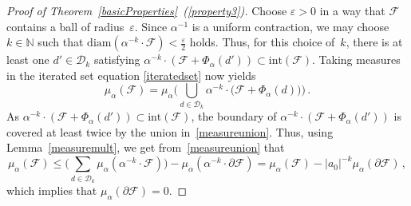 \documentclass[12pt]{amsart}
\theoremstyle{definition}
\theoremstyle{remark}
\numberwithin{equation}{section}
\begin{document}
\begin{proof}[Proof of Theorem~\ref{basicProperties}~(\ref{property3})]
Choose $\varepsilon>0$ in a way that $\mathcal{F}$ contains a ball of radius~$\varepsilon$.
Since $\alpha^{-1}$ is a uniform contraction, we may choose $k \in \mathbb{N}$ such that $\mathrm{diam}(\alpha^{-k} \cdot \mathcal{F}) < \frac\varepsilon2$ holds. Thus, for this choice of~$k$, there is at least one $d' \in \mathcal{D}_k$ satisfying $\alpha^{-k} \cdot (\mathcal{F} + \Phi_\alpha(d')) \subset \mathrm{int}(\mathcal{F})$.
Taking measures in the iterated set equation \eqref{iteratedset} now yields
\begin{equation}\label{measureunion}
\mu_\alpha(\mathcal{F}) = \mu_\alpha\bigg(\bigcup_{d \in \mathcal{D}_k} \alpha^{-k} \cdot \big(\mathcal{F} + \Phi_\alpha(d)\big)\bigg)\,.
\end{equation}
As $\alpha^{-k} \cdot (\mathcal{F} + \Phi_\alpha(d')) \subset \mathrm{int}(\mathcal{F})$, the boundary of $\alpha^{-k} \cdot (\mathcal{F} + \Phi_\alpha(d'))$ is covered at least twice by the union in~\eqref{measureunion}.
Thus, using Lemma~\ref{measuremult}, we get from~\eqref{measureunion} that
\[
\mu_\alpha(\mathcal{F}) \le \bigg( \sum_{d \in \mathcal{D}_k} \mu_\alpha(\alpha^{-k} \cdot \mathcal{F}) \bigg) - \mu_\alpha(\alpha^{-k} \cdot \partial\mathcal{F}) = \mu_\alpha(\mathcal{F}) - |a_0|^{-k} \mu_\alpha(\partial \mathcal{F})\,,
\]
which implies that $\mu_\alpha(\partial \mathcal{F}) = 0$.
\end{proof}
\end{document}
